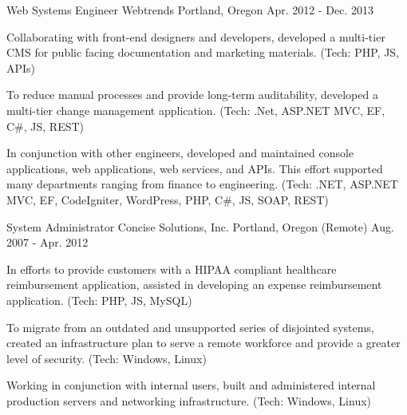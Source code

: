 \begin{cventries}
  \cventry
    {Web Systems Engineer} %
    {Webtrends} %
    {Portland, Oregon} %
    {Apr. 2012 - Dec. 2013} %
    {
      \begin{cvitems} %
        \item {Collaborating with front-end designers and developers, developed a multi-tier CMS for public facing documentation and marketing materials. (Tech: PHP, JS, APIs)}
        \item {To reduce manual processes and provide long-term auditability, developed a multi-tier change management application. (Tech: .Net, ASP.NET MVC, EF, C\#, JS, REST)}
        \item {In conjunction with other engineers, developed and maintained console applications, web applications, web services, and APIs. This effort supported many departments ranging from finance to engineering. (Tech: .NET, ASP.NET MVC, EF, CodeIgniter, WordPress, PHP, C\#, JS, SOAP, REST)}
      \end{cvitems}
    }

  \cventry
    {System Administrator} %
    {Concise Solutions, Inc.} %
    {Portland, Oregon (Remote)} %
    {Aug. 2007 - Apr. 2012} %
    {
      \begin{cvitems} %
        \item {In efforts to provide customers with a HIPAA compliant healthcare reimbursement application, assisted in developing an expense reimbursement application. (Tech: PHP, JS, MySQL)}
        \item {To migrate from an outdated and unsupported series of disjointed systems, created an infrastructure plan to serve a remote workforce and provide a greater level of security. (Tech: Windows, Linux)}
        \item {Working in conjunction with internal users, built and administered internal production servers and networking infrastructure. (Tech: Windows, Linux)}
      \end{cvitems}
    }

\end{cventries}
